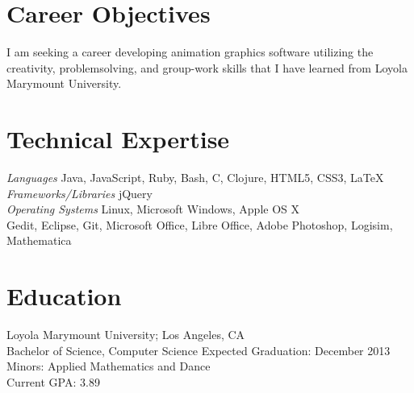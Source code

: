 \documentclass[line, margin]{res}
\begin{document}
\address{10565 Canyon Lake Drive \\ San Diego, CA 92131}

\begin{resume}
 
\section{Career Objectives} 
	I am seeking a career developing animation graphics software utilizing the creativity, problemsolving, and group-work skills that I have learned from Loyola Marymount University.

\section{Technical Expertise}
\textit{Languages} \hfill Java, JavaScript, Ruby, Bash, C, Clojure, HTML5, CSS3, LaTeX\\
\textit{Frameworks/Libraries} \hfill jQuery\\
\textit{Operating Systems} \hfill Linux, Microsoft Windows, Apple OS X\\
 \hfill Gedit, Eclipse, Git, Microsoft Office, Libre Office, Adobe Photoshop, Logisim, Mathematica\\

\section{Education}
	Loyola Marymount University; Los Angeles, CA\\
	Bachelor of Science, Computer Science \hfill Expected Graduation: December 2013\\
		Minors: Applied Mathematics and Dance\\
		Current GPA: 3.89


\end{resume}
\end{document}
